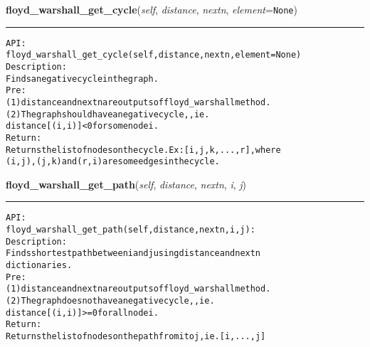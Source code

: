 \hspace{.8\funcindent}\begin{boxedminipage}{\funcwidth}

    \raggedright \textbf{floyd\_warshall\_get\_cycle}(\textit{self}, \textit{distance}, \textit{nextn}, \textit{element}={\tt None})

    \vspace{-1.5ex}

    \rule{\textwidth}{0.5\fboxrule}
\setlength{\parskip}{2ex}
\begin{alltt}

API:
    floyd\_warshall\_get\_cycle(self, distance, nextn, element = None)
Description:
    Finds a negative cycle in the graph.
Pre:
    (1) distance and nextn are outputs of floyd\_warshall method.
    (2) The graph should have a negative cycle, , ie.
    distance[(i,i)] {\textless} 0 for some node i.
Return:
    Returns the list of nodes on the cycle. Ex: [i,j,k,...,r], where
    (i,j), (j,k) and (r,i) are some edges in the cycle.
\end{alltt}

\setlength{\parskip}{1ex}
    \end{boxedminipage}

    \label{coinor:gimpy:graph:Graph:floyd_warshall_get_path}

    \vspace{0.5ex}

\hspace{.8\funcindent}\begin{boxedminipage}{\funcwidth}

    \raggedright \textbf{floyd\_warshall\_get\_path}(\textit{self}, \textit{distance}, \textit{nextn}, \textit{i}, \textit{j})

    \vspace{-1.5ex}

    \rule{\textwidth}{0.5\fboxrule}
\setlength{\parskip}{2ex}
\begin{alltt}

API:
    floyd\_warshall\_get\_path(self, distance, nextn, i, j):
Description:
    Finds shortest path between i and j using distance and nextn
    dictionaries.
Pre:
    (1) distance and nextn are outputs of floyd\_warshall method.
    (2) The graph does not have a negative cycle, , ie.
    distance[(i,i)] {\textgreater}=0 for all node i.
Return:
    Returns the list of nodes on the path from i to j, ie. [i,...,j]
\end{alltt}

\setlength{\parskip}{1ex}
    \end{boxedminipage}

